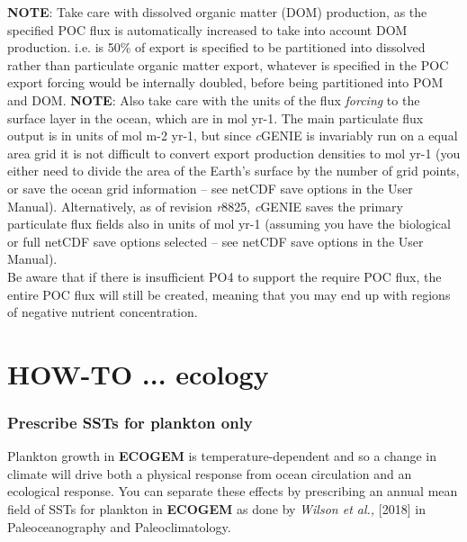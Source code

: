 \documentclass[11pt,fleqn]{book} %
\begin{document}
\begin{enumerate}[noitemsep]
\noindent \textbf{NOTE}: Take care with dissolved organic matter (DOM) production, as the specified POC flux is automatically increased to take into account DOM production. i.e. is 50\% of export is specified to be partitioned into dissolved rather than particulate organic matter export, whatever is specified in the POC export forcing would be internally doubled, before being partitioned into POM and DOM.
\noindent \textbf{NOTE}: Also take care with the units of the flux \textit{forcing} to the surface layer in the ocean, which are in mol yr-1. The main particulate flux output is in units of mol m-2 yr-1, but since \textit{c}GENIE is invariably run on a equal area grid it is not difficult to convert export production densities to mol yr-1 (you either need to divide the area of the Earth's surface by the number of grid points, or save the ocean grid information -- see netCDF save options in the User Manual). Alternatively, as of revision \textit{r}8825, \textit{c}GENIE saves the primary particulate flux fields also in units of mol yr-1 (assuming you have the biological or full netCDF save options selected -- see netCDF save options in the User Manual).
\\Be aware that if there is insufficient PO4 to support the require POC flux, the entire POC flux will still be created, meaning that you may end up with regions of negative nutrient concentration.

\end{enumerate}


\newpage


\section{HOW-TO ...  ecology}

%
\subsubsection{Prescribe SSTs for plankton only}
\vspace{1mm}

Plankton growth in \textbf{ECOGEM} is temperature-dependent and so a change in climate will drive both a physical response from ocean circulation and an ecological response. You can separate these effects by prescribing an annual mean field of SSTs for plankton in \textbf{ECOGEM} as done by \textit{Wilson et al.,} [2018] in Paleoceanography and Paleoclimatology. 
\end{document}
